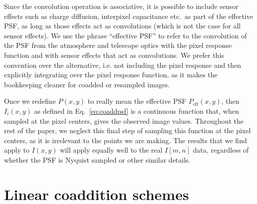 \documentclass{openjournal}
\newcommand{\mike}[1]{{\color{cyan}MJ: #1}}
\newcommand{\irresponse}[1]{{#1}}
\begin{document}
Since the convolution operation is associative, it is possible to include sensor effects such as charge diffusion, interpixel capacitance etc.\ as part of the effective PSF, as long as those effects act as convolutions (which is not the case for all sensor effects). We use the phrase ``effective PSF'' to refer to the convolution of the PSF from the atmosphere and telescope optics with the pixel response function and with sensor effects that act as convolutions.  We prefer this convention over the alternative, i.e. not including the pixel response and then explicitly integrating over the pixel response function, as it makes the bookkeeping cleaner for coadded or resampled images.



Once we redefine $P(x,y)$ to really mean the effective PSF $P_\text{eff}(x,y)$, then $I_i(x,y)$ as defined in Eq.~\eqref{eq:coaddpsf} is a continuous function that, when sampled at the pixel centers, gives the observed image values.
Throughout the rest of the paper, we neglect this final step of sampling this function at the pixel centers, as it is irrelevant to the points we are making.  The results that we find apply to $I(x,y)$ will apply equally \irresponse{well} to the real $I[m,n]$ data, regardless of whether the PSF is Nyquist sampled or other similar details.

\section{Linear coaddition schemes}\label{sec:lin}
\end{document}
